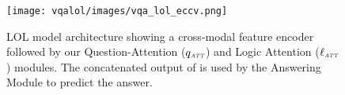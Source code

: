 \begin{figure}[t]
    \centering
    \texttt{[image: vqalol/images/vqa\_lol\_eccv.png]}
    \caption{LOL model architecture showing a cross-modal feature encoder followed by our Question-Attention ($q_{\textit{\tiny ATT}}$) and Logic Attention ($\ell_{\textit{\tiny ATT}}$) modules. 
    The concatenated output of  is used by the Answering Module to predict the answer.
    }
    \label{fig:model}
\end{figure}